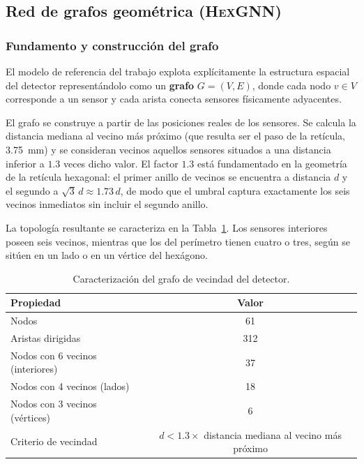 \subsection{Red de grafos geométrica (\textsc{HexGNN})}
\label{subsec:hexgnn}

\subsubsection{Fundamento y construcción del grafo}

El modelo de referencia del trabajo explota explícitamente la estructura espacial del detector
representándolo como un \textbf{grafo} $G = (V, E)$, donde cada nodo $v \in V$ corresponde a un
sensor y cada arista conecta sensores físicamente adyacentes.

El grafo se construye a partir de las posiciones reales de los sensores. Se calcula la distancia
mediana al vecino más próximo (que resulta ser el paso de la retícula, \SI{3.75}{\milli\metre}) y se
consideran vecinos aquellos sensores situados a una distancia inferior a $1.3$ veces dicho valor.
El factor $1.3$ está fundamentado en la geometría de la retícula hexagonal: el primer anillo de
vecinos se encuentra a distancia $d$ y el segundo a $\sqrt{3}\,d \approx 1.73\,d$, de modo que el
umbral captura exactamente los seis vecinos inmediatos sin incluir el segundo anillo.

La topología resultante se caracteriza en la Tabla~\ref{tab:grafo}. Los sensores interiores poseen
seis vecinos, mientras que los del perímetro tienen cuatro o tres, según se sitúen en un lado o en
un vértice del hexágono.

\begin{table}[htbp]
\centering
\caption{Caracterización del grafo de vecindad del detector.}
\label{tab:grafo}
\begin{tabular}{lc}
\toprule
\textbf{Propiedad} & \textbf{Valor} \\
\midrule
Nodos & 61 \\
Aristas dirigidas & 312 \\
Nodos con 6 vecinos (interiores) & 37 \\
Nodos con 4 vecinos (lados) & 18 \\
Nodos con 3 vecinos (vértices) & 6 \\
Criterio de vecindad & $d < 1.3 \times$ distancia mediana al vecino más próximo \\
\bottomrule
\end{tabular}
\end{table}

